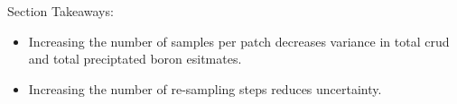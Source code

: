 Section Takeaways:
\begin{itemize}
    \item Increasing the number of samples per patch decreases variance in total crud and total preciptated boron esitmates.
    \item Increasing the number of re-sampling steps reduces uncertainty.
\end{itemize}
